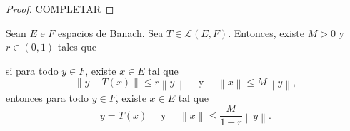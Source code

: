 \begin{proof}
	\color{red} COMPLETAR
\end{proof}

\begin{lemma}
	Sean $E$ e $F$ espacios de Banach. Sea $T \in \mathcal{L}(E, F)$. Entonces, existe $M > 0$ y $r \in (0, 1)$ tales que
	\begin{center}
		\begin{minipage}{0.9\linewidth}
			si para todo $y \in F$, existe $x \in E$ tal que
			\begin{equation*}
				\left\lVert y - T(x) \right\rVert \leq r \left\lVert y \right\rVert \quad \text{ y } \quad \left\lVert x \right\rVert \leq M \left\lVert y \right\rVert,
			\end{equation*}
			entonces para todo $y \in F$, existe $x \in E$ tal que
			\begin{equation*}
				y = T(x) \quad \text{ y } \quad \left\lVert x \right\rVert \leq \frac{M}{1-r} \left\lVert y \right\rVert.
			\end{equation*}
		\end{minipage}
	\end{center}
\end{lemma}